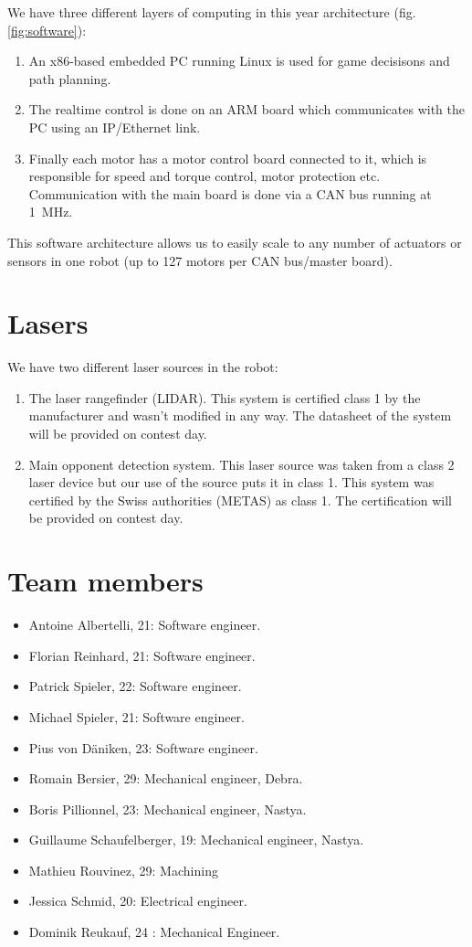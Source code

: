 \documentclass[a4paper]{paper}
\begin{document}
We have three different layers of computing in this year architecture (fig. \ref{fig:software}):
\begin{enumerate}
    \item An x86-based embedded PC running Linux is used for game decisisons and path planning.
    \item The realtime control is done on an ARM board which communicates with the PC using an IP/Ethernet link.
    \item Finally each motor has a motor control board connected to it, which is responsible for speed and torque control, motor protection etc.
        Communication with the main board is done via a CAN bus running at \SI{1}{\mega\hertz}.
\end{enumerate}


This software architecture allows us to easily scale to any number of actuators or sensors in one robot (up to 127 motors per CAN bus/master board).

\section{Lasers}
We have two different laser sources in the robot:
\begin{enumerate}
    \item The laser rangefinder (LIDAR).
        This system is certified class 1 by the manufacturer and wasn't modified in any way.
        The datasheet of the system will be provided on contest day.
    \item Main opponent detection system.
        This laser source was taken from a class 2 laser device but our use of the source puts it in class 1.
        This system was certified by the Swiss authorities (METAS) as class 1.
        The certification will be provided on contest day.
\end{enumerate}

\section{Team members}
\begin{itemize}
    \item Antoine Albertelli, 21: Software engineer.
    \item Florian Reinhard, 21:  Software engineer.
    \item Patrick Spieler, 22:  Software engineer.
    \item Michael Spieler, 21:  Software engineer.
    \item Pius von Däniken, 23:  Software engineer.
    \item Romain Bersier, 29:  Mechanical engineer, Debra.
    \item Boris Pillionnel, 23:  Mechanical engineer, Nastya.
    \item Guillaume Schaufelberger, 19: Mechanical engineer, Nastya.
    \item Mathieu Rouvinez, 29:  Machining
    \item Jessica Schmid, 20: Electrical engineer.
    \item Dominik Reukauf, 24 : Mechanical Engineer.
\end{itemize}
\end{document}
